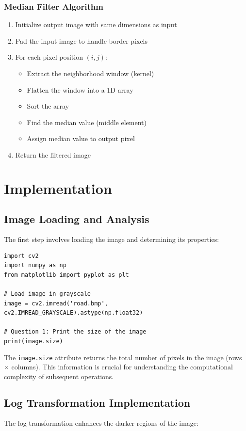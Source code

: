 \documentclass[12pt,a4paper]{article}
\begin{document}
\subsubsection{Median Filter Algorithm}
\begin{enumerate}
    \item Initialize output image with same dimensions as input
    \item Pad the input image to handle border pixels
    \item For each pixel position $(i,j)$:
    \begin{itemize}
        \item Extract the neighborhood window (kernel)
        \item Flatten the window into a 1D array
        \item Sort the array
        \item Find the median value (middle element)
        \item Assign median value to output pixel
    \end{itemize}
    \item Return the filtered image
\end{enumerate}

\section{Implementation}

\subsection{Image Loading and Analysis}
The first step involves loading the image and determining its properties:

\begin{lstlisting}[caption={Image Loading and Size Calculation}]
import cv2
import numpy as np
from matplotlib import pyplot as plt

# Load image in grayscale
image = cv2.imread('road.bmp', cv2.IMREAD_GRAYSCALE).astype(np.float32)

# Question 1: Print the size of the image
print(image.size)
\end{lstlisting}

The \texttt{image.size} attribute returns the total number of pixels in the image (rows $\times$ columns). This information is crucial for understanding the computational complexity of subsequent operations.

\subsection{Log Transformation Implementation}
The log transformation enhances the darker regions of the image:
\end{document}
